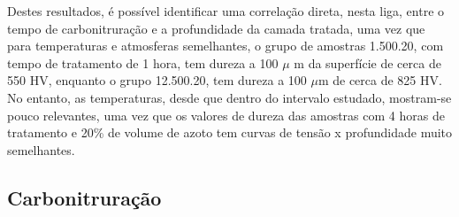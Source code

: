 \par
Destes resultados, é possível identificar uma correlação direta, nesta liga, entre o tempo de carbonitruração e a profundidade da camada tratada, uma vez que para temperaturas e atmosferas semelhantes, o grupo de amostras 1.500.20, com tempo de tratamento de 1 hora, tem dureza a 100 $\mu$ m da superfície de cerca de 550 HV, enquanto o grupo 12.500.20, tem dureza a 100 $\mu$m de cerca de 825 HV. No entanto, as temperaturas, desde que dentro do intervalo estudado, mostram-se pouco relevantes, uma vez que os valores de dureza das amostras com 4 horas de tratamento e 20\% de volume de azoto tem curvas de tensão x profundidade muito semelhantes.
\subsection{Carbonitruração} \label{ssec:soa_tratamentos_carbonitruracao}

